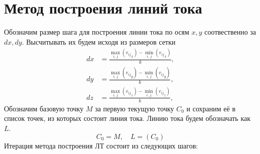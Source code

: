 \section{Метод построения линий тока}\label{method}
Обозначим размер шага для построения линии тока по осям $x, y$ соотвественно за $dx, dy$. Высчитывать их будем исходя из размеров сетки
\begin{align*}
	dx &= \frac{\max\limits_{i,\, j}\left({v_{ij}}_x\right)-\min\limits_{i,\, j}\left({v_{ij}}_x\right)}{k},\\ 
	dy &= \frac{\max\limits_{i,\, j}\left({v_{ij}}_y\right)-\min\limits_{i,\, j}\left({v_{ij}}_y\right)}{k},\\ 
	dz &= \frac{\max\limits_{i,\, j}\left({v_{ij}}_z\right)-\min\limits_{i,\, j}\left({v_{ij}}_z\right)}{k},
\end{align*}
Обозначим базовую точку $M$ за первую текущую точку $C_0$ и сохраним её в список точек, из которых состоит линия тока. Линию тока будем обозначать как $L$.
\begin{equation*}
	C_0 = M,\quad L=(C_0)
\end{equation*}
Итерация метода построения ЛТ состоит из следующих шагов:
